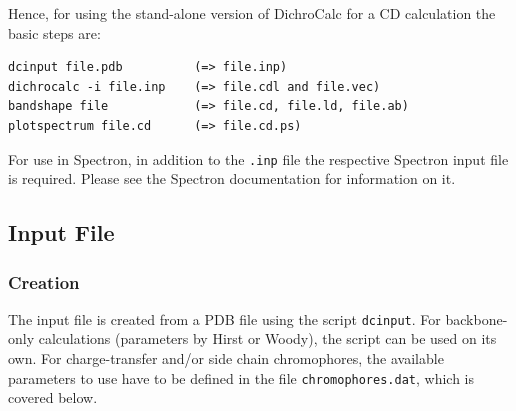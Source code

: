 \documentclass[11pt, letterpaper]{article}
\begin{document}
Hence, for using the stand-alone version of DichroCalc for a CD calculation the basic steps are:
\begin{verbatim}
dcinput file.pdb          (=> file.inp)
dichrocalc -i file.inp    (=> file.cdl and file.vec)
bandshape file            (=> file.cd, file.ld, file.ab)
plotspectrum file.cd      (=> file.cd.ps)
\end{verbatim}

For use in Spectron, in addition to the \verb'.inp' file the respective Spectron input file is required. Please see the Spectron documentation for information on it.


 

\subsection{Input File}


\subsubsection{Creation}
\label{Sec:Creation}

The input file is created from a PDB file using the script \verb'dcinput'. For backbone-only calculations (parameters by Hirst or Woody), the script can be used on its own. For charge-transfer and/or side chain chromophores, the available parameters to use have to be defined in the file \verb'chromophores.dat', which is covered below.
\end{document}
